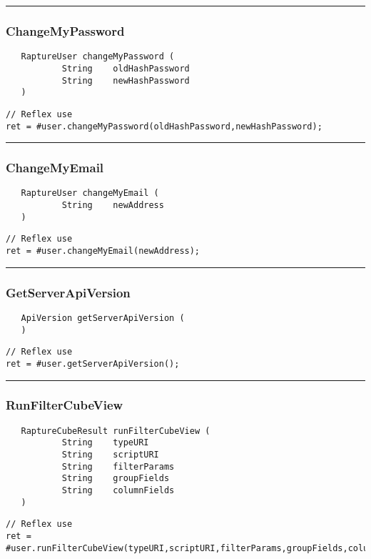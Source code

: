 \rule{15cm}{2pt}
\subsubsection{ChangeMyPassword}
\label{Api:ChangeMyPassword}
\begin{verbatim}
   RaptureUser changeMyPassword (
           String    oldHashPassword
           String    newHashPassword
   )
\end{verbatim}
\begin{lstlisting}[language=reflex]
// Reflex use
ret = #user.changeMyPassword(oldHashPassword,newHashPassword);
\end{lstlisting}



\rule{15cm}{2pt}
\subsubsection{ChangeMyEmail}
\label{Api:ChangeMyEmail}
\begin{verbatim}
   RaptureUser changeMyEmail (
           String    newAddress
   )
\end{verbatim}
\begin{lstlisting}[language=reflex]
// Reflex use
ret = #user.changeMyEmail(newAddress);
\end{lstlisting}



\rule{15cm}{2pt}
\subsubsection{GetServerApiVersion}
\label{Api:GetServerApiVersion}
\begin{verbatim}
   ApiVersion getServerApiVersion (
   )
\end{verbatim}
\begin{lstlisting}[language=reflex]
// Reflex use
ret = #user.getServerApiVersion();
\end{lstlisting}



\rule{15cm}{2pt}
\subsubsection{RunFilterCubeView}
\label{Api:RunFilterCubeView}
\begin{verbatim}
   RaptureCubeResult runFilterCubeView (
           String    typeURI
           String    scriptURI
           String    filterParams
           String    groupFields
           String    columnFields
   )
\end{verbatim}
\begin{lstlisting}[language=reflex]
// Reflex use
ret = #user.runFilterCubeView(typeURI,scriptURI,filterParams,groupFields,columnFields);
\end{lstlisting}




